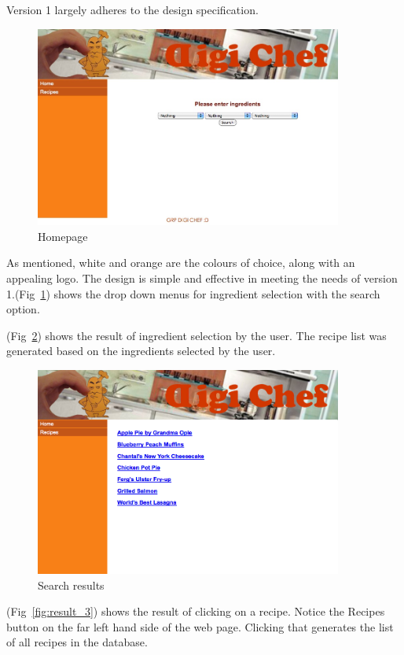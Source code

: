Version 1 largely adheres to the design specification.

\begin{figure}
\includegraphics[width=0.9\textwidth]{result_1}
\caption{Homepage}
\label{fig:result_1}
\end{figure}


As mentioned, white and orange are the colours of choice, along with an appealing logo. The design is simple and effective in meeting the needs of version 1.(Fig~\ref{fig:result_1}) shows the drop down menus for ingredient selection with the search option.

(Fig~\ref{fig:result_2}) shows the result of ingredient selection by the user. The recipe list was generated based on the ingredients selected by the user.

\begin{figure}
\includegraphics[width=0.9\textwidth]{result_2}
\caption{Search results}
\label{fig:result_2}
\end{figure}

(Fig~\ref{fig:result_3}) shows the result of clicking on a recipe. Notice the Recipes button on the far left hand side of the web page. Clicking that generates the list of all recipes in the database.

